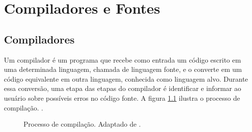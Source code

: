 \chapter{Compiladores e Fontes}

\section{Compiladores}




Um compilador é um programa que recebe como entrada um código escrito em uma determinada linguagem, chamada de linguagem fonte, e o converte em um código equivalente em outra linguagem, conhecida como linguagem alvo. Durante essa conversão, uma etapa das etapas do compilador é identificar e informar ao usuário sobre possíveis erros no código fonte. A figura \ref{fig:compilador} ilustra o processo de compilação.
\cite{aho1977principles}.

\begin{figure}[H]
	\centering


	\caption{Processo de compilação. Adaptado de \cite{aho1977principles}.}
	\label{fig:compilador}
\end{figure}

